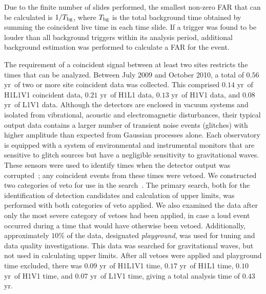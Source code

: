 \documentclass[prd,superscriptaddress,showpacs,amssymb,amsmath,amsfonts,aps,altaffilletter,nofootinbib,letterpaper,twocolumn]{revtex4}
\def\HLltpreVeto{\ensuremath{0.21} yr}
\def\HVltpreVeto{\ensuremath{0.13} yr}
\def\LVltpreVeto{\ensuremath{0.08} yr}
\def\HLVltpreVeto{\ensuremath{0.14} yr}
\def\totalpreVeto{\ensuremath{0.56} yr}
\def\HLlt{\ensuremath{0.17} yr}
\def\HVlt{\ensuremath{0.10} yr}
\def\LVlt{\ensuremath{0.07} yr}
\def\HLVlt{\ensuremath{0.09} yr}
\def\totalTime{\ensuremath{0.43} yr}
\begin{document}
Due to the finite number of slides performed, the
smallest non-zero FAR that can be calculated is $1/T_{\rm bg}$, where
$T_{\rm bg}$ is the total background time obtained by summing the
coincident live time in each time slide. If a trigger was found to be
louder than all background triggers within its analysis period,
additional background estimation was performed to calculate a \ac{FAR}
for the event.

The requirement of a coincident signal between at least two sites
restricts the times that can be analyzed.  Between July 2009 and October
2010, a total of \totalpreVeto~of two or more site coincident data was
collected.  This comprised \HLVltpreVeto~of H1L1V1 coincident data,
\HLltpreVeto~of H1L1 data, \HVltpreVeto~of H1V1 data, and
\LVltpreVeto~of L1V1 data.  Although the detectors are enclosed in
vacuum systems and isolated from vibrational, acoustic and
electromagnetic disturbances, their typical output data contains a
larger number of transient noise events (glitches) with higher amplitude
than expected from Gaussian processes alone.  Each observatory is
equipped with a system of environmental and instrumental monitors that
are sensitive to glitch sources but have a negligible sensitivity to
gravitational waves. These sensors were used to identify times when the
detector output was corrupted~\cite{Christensen:2010}; any coincident
events from these times were vetoed.  We constructed two categories of veto
for use in the search~\cite{s6detchar}.  The primary search, both for
the identification of detection candidates and calculation of upper
limits, was performed with both categories of veto applied.  We also
examined the data after only the most severe category of vetoes had been
applied, in case a loud event occurred during a time that would have
otherwise been vetoed.  Additionally, approximately $10\%$ of the data,
designated {\it playground}, was used for tuning and data quality
investigations.  This data was searched for gravitational waves, but not
used in calculating upper limits.  After all vetoes were applied and
playground time excluded, there was \HLVlt~of H1L1V1 time, \HLlt~of H1L1
time, \HVlt~of H1V1 time, and \LVlt~of L1V1 time, giving a total
analysis time of \totalTime.


\end{document}
